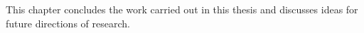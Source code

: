 This chapter concludes the work carried out in this thesis and discusses ideas for future directions of research. 